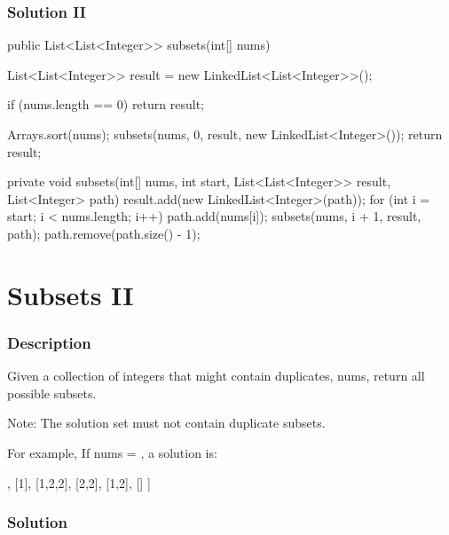 \newpage

\subsubsection{Solution II}

\begin{Code}
public List<List<Integer>> subsets(int[] nums) {
    List<List<Integer>> result = new LinkedList<List<Integer>>();

    if (nums.length == 0) {
        return result;
    }

    Arrays.sort(nums);
    subsets(nums, 0, result, new LinkedList<Integer>());
    return result;
}

private void subsets(int[] nums, int start, List<List<Integer>> result, List<Integer> path) {
    result.add(new LinkedList<Integer>(path));
    for (int i = start; i < nums.length; i++) {
        path.add(nums[i]);
        subsets(nums, i + 1, result, path);
        path.remove(path.size() - 1);
    }
}
\end{Code}

\newpage

\section{Subsets II} %

\subsubsection{Description}
Given a collection of integers that might contain duplicates, nums, return all possible subsets.

Note: The solution set must not contain duplicate subsets.

For example,
If nums = \code{[1,2,2]}, a solution is:

\begin{Code}
[
  [2],
  [1],
  [1,2,2],
  [2,2],
  [1,2],
  []
]
\end{Code}

\subsubsection{Solution}

